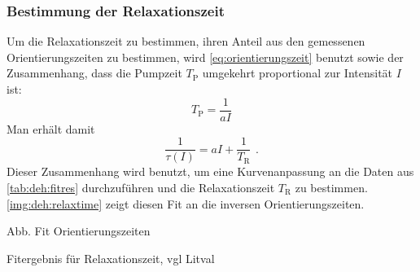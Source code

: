 \subsubsection*{Bestimmung der Relaxationszeit}
Um die Relaxationszeit zu bestimmen, ihren Anteil aus den gemessenen Orientierungszeiten zu bestimmen,
wird \autoref{eq:orientierungszeit} benutzt sowie der Zusammenhang,
dass die Pumpzeit $T_\text{P}$ umgekehrt proportional zur Intensität $I$ ist:
\begin{equation}
  T_\text{P} = \frac{1}{aI} 
\end{equation}
Man erhält damit
\begin{equation}
  \frac{1}{\tau(I)}=aI + \frac{1}{T_\text{R}} \ \,.
\end{equation}
Dieser Zusammenhang wird benutzt, um eine Kurvenanpassung an die Daten aus \autoref{tab:deh:fitres}
durchzuführen und die Relaxationszeit $T_\text{R}$ zu bestimmen.
\autoref{img:deh:relaxtime} zeigt diesen Fit an die inversen Orientierungszeiten.


Abb. Fit Orientierungszeiten




Fitergebnis für Relaxationszeit, vgl Litval

